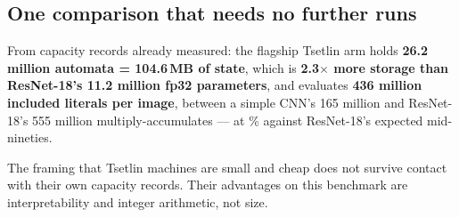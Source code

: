 \subsection{One comparison that needs no further runs}
From capacity records already measured: the flagship Tsetlin arm holds \textbf{26.2 million automata
= 104.6\,MB of state}, which is \textbf{2.3$\times$ more storage than ResNet-18's 11.2 million
fp32 parameters}, and evaluates \textbf{436 million included literals per image}, between a simple
CNN's 165 million and ResNet-18's 555 million multiply-accumulates --- at \PreflightTest\% against
ResNet-18's expected mid-nineties.

The framing that Tsetlin machines are small and cheap does not survive contact with their own capacity
records. Their advantages on this benchmark are interpretability and integer arithmetic, not size.
